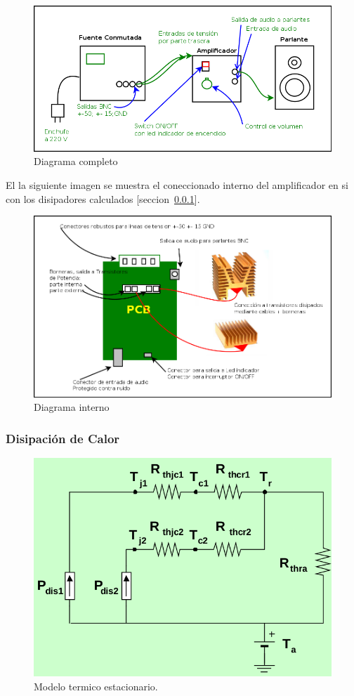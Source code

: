 \documentclass[a4paper,12pt,twoside]{article}
\begin{document}
\begin{figure}[H]
\centering
\includegraphics[width=1\textwidth]{img/integracion/diagrama_completo}
\caption{Diagrama completo}
\label{fig:diag_completo} 
\end{figure}

El la siguiente imagen se muestra el coneccionado interno del amplificador en si con los disipadores calculados [seccion~\ref{sec:disipadores}].

\begin{figure}[H]
\centering
\includegraphics[width=1\textwidth]{img/integracion/diagrama_interno}
\caption{Diagrama interno}
\label{fig:circuito} 
\end{figure}




\subsubsection{Disipación de Calor}
\label{sec:disipadores}
\begin{figure}[H]
    \centering
    \includegraphics[height=0.4\textwidth]{img/calculo_disipador}
    \caption{Modelo termico estacionario.}
    \label{fig:disipadores}
\end{figure}
\end{document}
